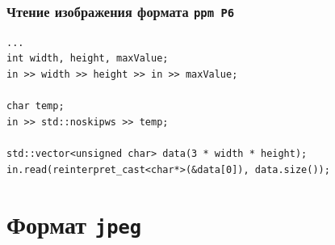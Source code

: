\documentclass[10pt,pdf,hyperref={unicode}]{beamer}
\begin{document}
\begin{frame}[fragile]
\frametitle{Чтение изображения формата \texttt{ppm P6} } 
\begin{lstlisting}
...
int width, height, maxValue;
in >> width >> height >> in >> maxValue;

char temp;
in >> std::noskipws >> temp;

std::vector<unsigned char> data(3 * width * height);
in.read(reinterpret_cast<char*>(&data[0]), data.size());
\end{lstlisting}
\end{frame}

\section{Формат \texttt{jpeg}}
\end{document}
